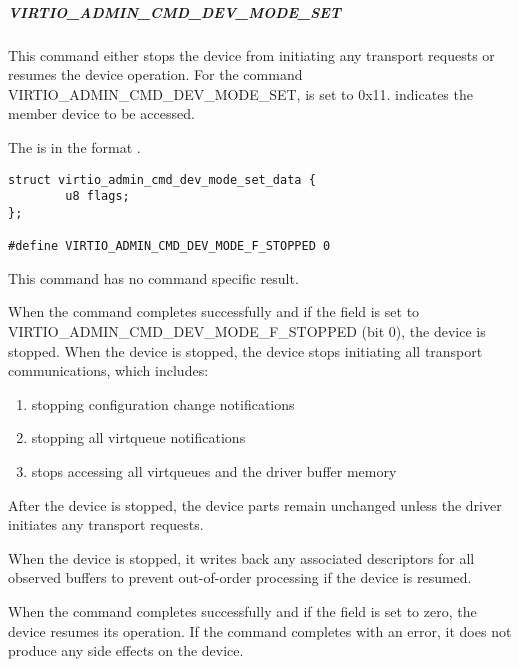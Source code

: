 \subparagraph{VIRTIO_ADMIN_CMD_DEV_MODE_SET}\label{par:Basic Facilities of a Virtio Device / Device groups / Group administration commands / Device parts / Device parts handling commands / VIRTIO_ADMIN_CMD_DEV_MODE_SET}

This command either stops the device from initiating any transport requests or
resumes the device operation. For the command VIRTIO_ADMIN_CMD_DEV_MODE_SET,
 is set to 0x11.  indicates the member
device to be accessed.

The  is in the format
.

\begin{lstlisting}
struct virtio_admin_cmd_dev_mode_set_data {
        u8 flags;
};

#define VIRTIO_ADMIN_CMD_DEV_MODE_F_STOPPED 0
\end{lstlisting}

This command has no command specific result.

When the command completes successfully and if the  field is set
to VIRTIO_ADMIN_CMD_DEV_MODE_F_STOPPED (bit 0), the device is stopped.
When the device is stopped, the device stops initiating all transport
communications, which includes:

\begin{enumerate}
\item stopping configuration change notifications
\item stopping all virtqueue notifications
\item stops accessing all virtqueues and the driver buffer memory
\end{enumerate}

After the device is stopped, the device parts remain unchanged unless
the driver initiates any transport requests.

When the device is stopped, it writes back any associated descriptors for all
observed buffers to prevent out-of-order processing if the device is resumed.

When the command completes successfully and if the  field
is set to zero, the device resumes its operation. If the command completes
with an error, it does not produce any side effects on the device.
